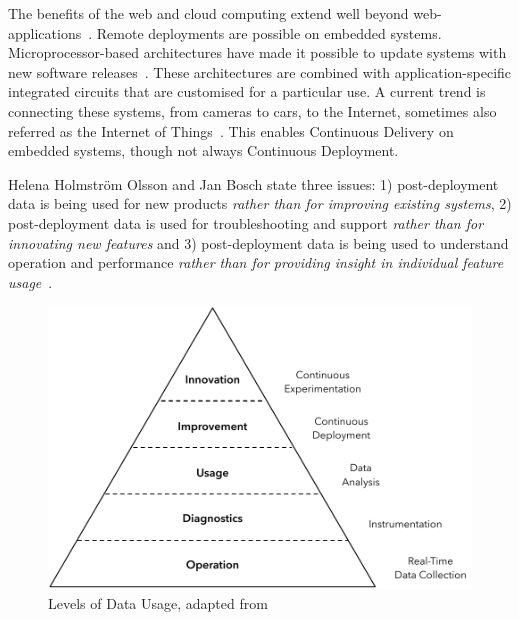 \documentclass[english]{tktltiki2}
\begin{document}
The benefits of the web and cloud computing extend well beyond web-applications~\cite{BE12}. Remote deployments are possible on embedded systems. Microprocessor-based architectures have made it possible to update systems with new software releases~\cite{RA03}. These architectures are combined with application-specific integrated circuits that are customised for a particular use. A current trend is connecting these systems, from cameras to cars, to the Internet, sometimes also referred as the Internet of Things~\cite{BE12, HB14}. This enables Continuous Delivery on embedded systems, though not always Continuous Deployment.

Helena Holmström Olsson and Jan Bosch state three issues: 1) post-deployment data is being used for new products \emph{rather than for improving existing systems}, 2) post-deployment data is used for troubleshooting and support \emph{rather than for innovating new features} and 3) post-deployment data is being used to understand operation and performance \emph{rather than for providing insight in individual feature usage}~\cite{HB14}.

\begin{figure}[h!]

    \centering
    \vspace{1cm}

    \includegraphics[scale = 0.6]{figures/data-usage}

    \caption{Levels of Data Usage, adapted from~\cite{HB14}}
    \label{figure:data-usage}

    \vspace{1cm}

\end{figure}
\end{document}
